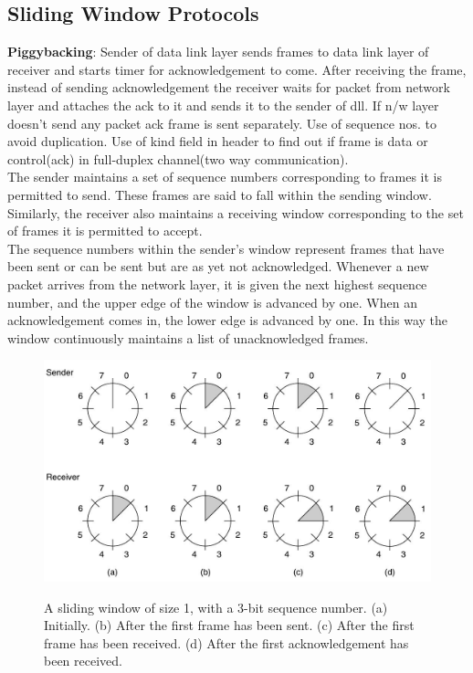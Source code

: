 \documentclass[a4paper,oneside]{book}
\begin{document}
\subsection{Sliding Window Protocols}
\textbf{Piggybacking}: Sender of data link layer sends frames to data link layer of receiver and starts timer for acknowledgement to come. After receiving the frame, instead of sending acknowledgement the receiver waits for packet from network layer and attaches the ack to it and sends it to the sender of dll. If n/w layer doesn't send any packet ack frame is sent separately. Use of sequence nos. to avoid duplication. Use of kind field in header to find out if frame is data or control(ack) in full-duplex channel(two way communication).\\
The sender maintains a set of sequence numbers corresponding to frames it is permitted to send. These frames are said to fall within the sending window. Similarly, the receiver also maintains a receiving window corresponding to the set of frames it is permitted to accept.\\
The sequence numbers within the sender's window represent frames that have been sent or can be sent but are as yet not acknowledged. Whenever a new packet arrives from the network layer, it is given the next highest sequence number, and the upper edge of the window is advanced by one. When an acknowledgement comes in, the lower edge is advanced by one. In this way the window continuously maintains a list of unacknowledged frames.
\begin{figure}[H]
\caption{A sliding window of size 1, with a 3-bit sequence number. (a) Initially. (b) After the first frame has been sent. (c) After the first frame has been received. (d) After the first acknowledgement has been received.}
\includegraphics[scale=0.6]{Images/slidingwindow1}
\label{fig:cn_sliding_window_1}
\end{figure}
\end{document}

